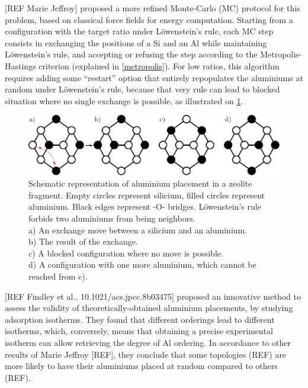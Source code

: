 \documentclass[main.tex]{subfiles}
\begin{document}
[REF Marie Jeffroy]\label{mariejeffroy_al} proposed a more refined Monte-Carlo (MC) protocol for this problem, based on classical force fields for energy computation. Starting from a configuration with the target \SiAl ratio under L\"owenstein's rule, each MC step consists in exchanging the positions of a Si and an Al while maintaining L\"owenstein's rule, and accepting or refusing the step according to the Metropolis-Hastings criterion (explained in \cref{metropolis}). For low \SiAl ratios, this algorithm requires adding some ``restart'' option that entirely repopulates the aluminiums at random under L\"owenstein's rule, because that very rule can lead to blocked situation where no single \SiAl exchange is possible, as illustrated on \cref{fig:blocked_situation}.

\begin{figure}
	\centering
	\includegraphics[width=\columnwidth]{figures/cations/blocked_situation.pdf}
	\caption{Schematic representation of aluminium placement in a zeolite fragment. Empty circles represent silicium, filled circles represent aluminium. Black edges represent -O- bridges. L\"owenstein's rule forbids two aluminiums from being neighbors.\\a) An exchange move between a silicium and an aluminium.\\b) The result of the exchange.\\c) A blocked configuration where no move is possible.\\d) A configuration with one more aluminium, which cannot be reached from c).}\label{fig:blocked_situation}
\end{figure}

[REF Findley et al., 10.1021/acs.jpcc.8b03475] proposed an innovative method to assess the validity of theoretically-obtained aluminium placements, by studying  adsorption isotherms. They found that different \SiAl orderings lead to different isotherms, which, conversely, means that obtaining a precise experimental isotherm can allow retrieving the degree of Al ordering. In accordance to other results of Marie Jeffroy [REF], they conclude that some topologies (REF) are more likely to have their aluminiums placed at random compared to others (REF).
\end{document}
